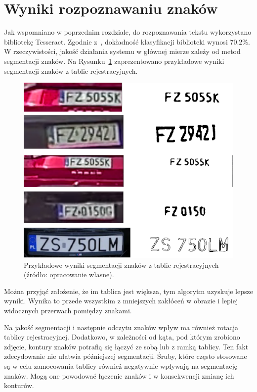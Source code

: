 \section{Wyniki rozpoznawaniu znaków}
Jak wspomniano w poprzednim rozdziale, do rozpoznawania tekstu wykorzystano bibliotekę Tesseract.
Zgodnie z~\cite{sym12050715}, dokładność klasyfikacji biblioteki wynosi $70.2\%$.
\linebreak W rzeczywistości, jakość działania systemu w głównej mierze zależy od metod segmentacji znaków.
Na Rysunku~\ref{fig:plates} zaprezentowano przykładowe wyniki segmentacji znaków z tablic rejestracyjnych.
\begin{figure}[!ht]
    \centering
    \includegraphics[scale=0.4]{Pictures/plates}
    \caption{Przykładowe wyniki segmentacji znaków z tablic rejestracyjnych (źródło: opracowanie własne).}
    \label{fig:plates}
\end{figure}
\FloatBarrier
Można przyjąć założenie, że im tablica jest większa, tym algorytm uzyskuje lepsze wyniki.
Wynika to przede wszystkim z mniejszych zakłóceń w obrazie i lepiej widocznych przerwach pomiędzy znakami.

Na jakość segmentacji i następnie odczytu znaków wpływ ma również rotacja tablicy rejestracyjnej.
Dodatkowo, w zależności od kąta, pod którym zrobiono zdjęcie, kontury znaków potrafią się łączyć ze sobą lub z ramką tablicy.
Ten fakt zdecydowanie nie ułatwia późniejszej segmentacji.
Śruby, które często stosowane są w celu zamocowania tablicy również negatywnie wpływają na segmentację znaków.
Mogą one powodować łączenie znaków i w konsekwencji zmianę ich konturów.

